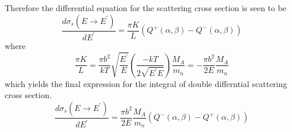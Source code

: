Therefore the differential equation for the scattering cross section is seen to be
\begin{equation}
\label{app_int_qe_pre}
\frac{d\sigma_s(E\to E^\prime)}{dE^\prime} = 
    \frac{\pi K}{L} \left(Q^+(\alpha, \beta) - Q^-(\alpha, \beta) \right) 
\end{equation}
where 
\begin{equation}
\label{app_pi_K_L}
\frac{\pi K}{L} = \frac{\pi b^2}{kT} \sqrt{\frac{E^\prime}{E}} \left(\frac{-kT}{2\sqrt{E^\prime E}}\right) \frac{M_A}{m_n}
                = - \frac{\pi b^2}{2E} \frac{M_A}{m_n}
\end{equation}
which yields the final expression for the integral of double differntial scattering cross section.
\begin{equation}
\label{app_int_qe_pre}
\frac{d\sigma_s(E\to E^\prime)}{dE^\prime} = 
    \frac{\pi b^2}{2E} \frac{M_A}{m_n}
    \left(Q^-(\alpha, \beta) - Q^+(\alpha, \beta) \right) 
\end{equation}
